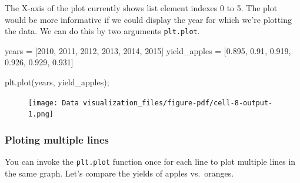 \documentclass[
  letterpaper,
  DIV=11,
  numbers=noendperiod]{scrreprt}
\newenvironment{Shaded}{\begin{snugshade}}{\end{snugshade}}
\newcommand{\DecValTok}[1]{\textcolor[rgb]{0.68,0.00,0.00}{#1}}
\newcommand{\FloatTok}[1]{\textcolor[rgb]{0.68,0.00,0.00}{#1}}
\newcommand{\NormalTok}[1]{\textcolor[rgb]{0.00,0.23,0.31}{#1}}
\newcommand{\OperatorTok}[1]{\textcolor[rgb]{0.37,0.37,0.37}{#1}}
\begin{document}
The X-axis of the plot currently shows list element indexes 0 to 5. The
plot would be more informative if we could display the year for which
we're plotting the data. We can do this by two arguments
\texttt{plt.plot}.

\begin{Shaded}
\begin{Highlighting}[]
\NormalTok{years }\OperatorTok{=}\NormalTok{ [}\DecValTok{2010}\NormalTok{, }\DecValTok{2011}\NormalTok{, }\DecValTok{2012}\NormalTok{, }\DecValTok{2013}\NormalTok{, }\DecValTok{2014}\NormalTok{, }\DecValTok{2015}\NormalTok{]}
\NormalTok{yield\_apples }\OperatorTok{=}\NormalTok{ [}\FloatTok{0.895}\NormalTok{, }\FloatTok{0.91}\NormalTok{, }\FloatTok{0.919}\NormalTok{, }\FloatTok{0.926}\NormalTok{, }\FloatTok{0.929}\NormalTok{, }\FloatTok{0.931}\NormalTok{]}
\end{Highlighting}
\end{Shaded}

\begin{Shaded}
\begin{Highlighting}[]
\NormalTok{plt.plot(years, yield\_apples)}\OperatorTok{;}
\end{Highlighting}
\end{Shaded}

\begin{figure}[H]

{\centering \texttt{[image: Data visualization\_files/figure-pdf/cell-8-output-1.png]}

}

\end{figure}

\hypertarget{ploting-multiple-lines}{%
\subsubsection{Ploting multiple lines}\label{ploting-multiple-lines}}

You can invoke the \texttt{plt.plot} function once for each line to plot
multiple lines in the same graph. Let's compare the yields of apples
vs.~oranges.
\end{document}
